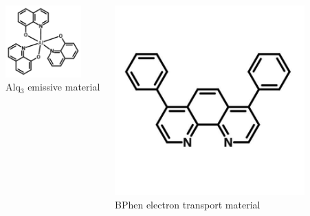 \documentclass{beamer}
\begin{document}
\begin{frame}
\begin{columns}
\begin{column}{0.3\textwidth}
					\includegraphics[width=0.8\textwidth]{images/Alq3_structure.png}\\
					\tiny Alq$_3$ emissive material
				\end{column}
				\begin{column}{0.3\textwidth}
					\centering
					\includegraphics[width=0.8\textwidth]{images/bphen_structure.jpg}\\
					\tiny BPhen electron transport material
				\end{column}
			\end{columns}
		\end{frame}
    
\end{document}
